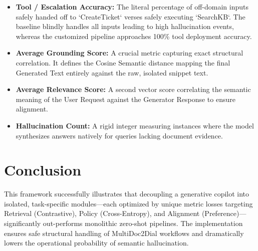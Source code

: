 \documentclass[11pt]{article}
\begin{document}
\begin{itemize}
    \item \textbf{Tool / Escalation Accuracy:} The literal percentage of off-domain inputs safely handed off to `CreateTicket` verses safely executing `SearchKB`. The baseline blindly handles all inputs leading to high hallucination events, whereas the customized pipeline approaches 100\% tool deployment accuracy.
    \item \textbf{Average Grounding Score:} A crucial metric capturing exact structural correlation. It defines the Cosine Semantic distance mapping the final Generated Text entirely against the raw, isolated snippet text.
    \item \textbf{Average Relevance Score:} A second vector score correlating the semantic meaning of the User Request against the Generator Response to ensure alignment.
    \item \textbf{Hallucination Count:} A rigid integer measuring instances where the model synthesizes answers natively for queries lacking document evidence. 
\end{itemize}

\section{Conclusion}
This framework successfully illustrates that decoupling a generative copilot into isolated, task-specific modules—each optimized by unique metric losses targeting Retrieval (Contrastive), Policy (Cross-Entropy), and Alignment (Preference)—significantly out-performs monolithic zero-shot pipelines. The implementation ensures safe structural handling of MultiDoc2Dial workflows and dramatically lowers the operational probability of semantic hallucination.
\end{document}
